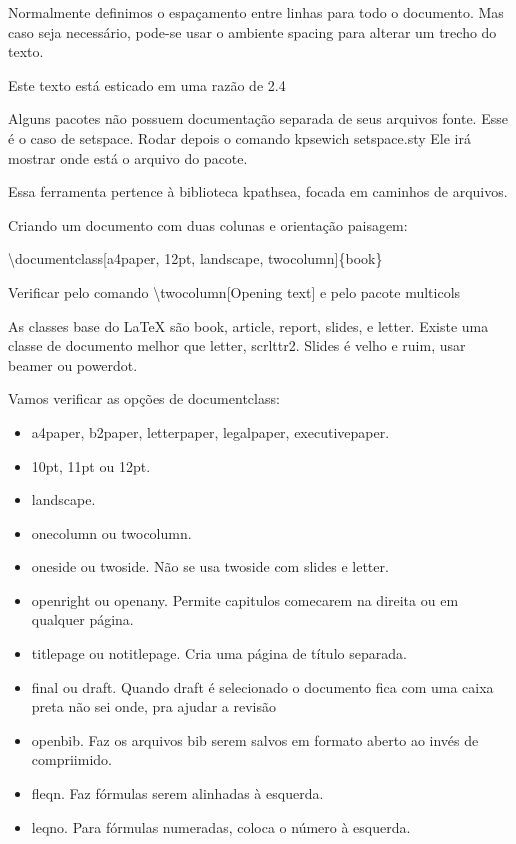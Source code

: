 \documentclass[a4paper, 12pts]{book}
\begin{document}
Normalmente definimos o espaçamento entre linhas para todo o documento.
Mas caso seja necessário, pode-se usar o ambiente spacing para alterar um trecho do texto.

\begin{spacing}{2.4}
    Este texto está esticado em uma razão de 2.4
\end{spacing}

Alguns pacotes não possuem documentação separada de seus arquivos fonte.
Esse é o caso de setspace.
Rodar depois o comando kpsewich setspace.sty
Ele irá mostrar onde está o arquivo do pacote.

Essa ferramenta pertence à biblioteca kpathsea, focada em caminhos de arquivos.

Criando um documento com duas colunas e orientação paisagem:

\textbackslash documentclass[a4paper, 12pt, landscape, twocolumn]\{book\}

Verificar pelo comando \textbackslash twocolumn[Opening text]
e pelo pacote multicols

As classes base do LaTeX são book, article, report, slides, e letter.
Existe uma classe de documento melhor que letter, scrlttr2. Slides é velho e ruim, usar beamer ou powerdot.


Vamos verificar as opções de documentclass:
\begin{itemize}
    \item a4paper, b2paper, letterpaper, legalpaper, executivepaper.
    \item 10pt, 11pt ou 12pt. 
    \item landscape.
    \item onecolumn ou twocolumn.
    \item oneside ou twoside. Não se usa twoside com slides e letter.
    \item openright ou openany. Permite capitulos comecarem na direita ou em qualquer página.
    \item titlepage ou notitlepage. Cria uma página de título separada.
    \item final ou draft. Quando draft é selecionado o documento fica com uma caixa preta não sei onde, pra ajudar a revisão
    \item openbib. Faz os arquivos bib serem salvos em formato aberto ao invés de compriimido.
    \item fleqn. Faz fórmulas serem alinhadas à esquerda.
    \item leqno. Para fórmulas numeradas, coloca o número à esquerda.
\end{itemize}
\end{document}
